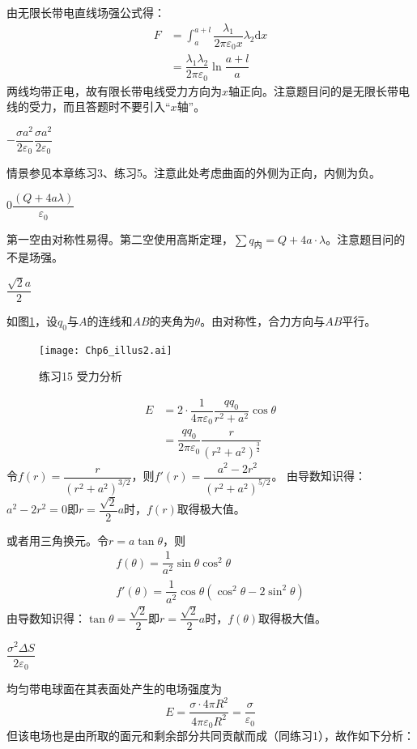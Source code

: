 \documentclass[b5paper,opensource,sourcefont,parskip]{qyxf-book}
\newcommand{\di}[1]{\mathrm{d}#1}
\begin{document}
由无限长带电直线场强公式得：
\begin{align*}
F&=\int_{a}^{a+l}\dfrac{\lambda_1}{2\pi \varepsilon_0 x}\lambda_2\di{x}\\
&=\dfrac{\lambda_1\lambda_2}{2\pi \varepsilon_0}\ln\dfrac{a+l}{a}
\end{align*}
两线均带正电，故有限长带电线受力方向为$x$轴正向。注意题目问的是无限长带电线的受力，而且答题时不要引入“$x$轴”。

$-\dfrac{\sigma a^2}{2\varepsilon_0}$\quad$\dfrac{\sigma a^2}{2\varepsilon_0}$

\solve
情景参见本章练习3、练习5。注意此处考虑曲面的外侧为正向，内侧为负。

0\quad $\dfrac{(Q+4a\lambda)}{\varepsilon_0}$

\solve
第一空由对称性易得。第二空使用高斯定理，$\sum q_{\text{内}}=Q+4a\cdot\lambda$。注意题目问的不是场强。

$\dfrac{\sqrt{2}a}{2}$

\solve
如图\ref{fig:c6-t15}，设$q_0$与$A$的连线和$AB$的夹角为$\theta$。由对称性，合力方向与$AB$平行。
\begin{figure}[!htbp]
	\centering
	\texttt{[image: Chp6\_illus2.ai]}
	\caption{练习15 受力分析}\label{fig:c6-t15}
\end{figure}
\begin{align*}
E&=2\cdot \dfrac{1}{4\pi\varepsilon_0}\dfrac{qq_0}{r^2+a^2}\cos\theta\\
&=\dfrac{qq_0}{2\pi\varepsilon_0}\dfrac{r}{{(r^2+a^2)}^{\frac{3}{2}}}
\end{align*}
令$f(r)=\dfrac{r}{{(r^2+a^2)}^{3/2}}$，则$f'(r)=\dfrac{a^2-2r^2}{{(r^2+a^2)}^{5/2}}$。
由导数知识得：$a^2-2r^2=0\text{即}r=\dfrac{\sqrt{2}}{2}a$时，$f(r)$取得极大值。

或者用三角换元。令$r=a\tan\theta$，则
\begin{gather*}
f(\theta)=\dfrac{1}{a^2}\sin\theta\cos^2\theta\\
f'(\theta)=\dfrac{1}{a^2}\cos\theta(\cos^2\theta-2\sin^2\theta)
\end{gather*}
由导数知识得：$\tan\theta=\dfrac{\sqrt{2}}{2}\text{即}r=\dfrac{\sqrt{2}}{2}a$时，$f(\theta)$取得极大值。

$\dfrac{\sigma^2\Delta S}{2\varepsilon_0}$

\solve
均匀带电球面在其表面处产生的电场强度为
\[
E=\dfrac{\sigma\cdot 4\pi R^2}{4\pi\varepsilon_0R^2}=\dfrac{\sigma}{\varepsilon_0}
\]
但该电场也是由所取的面元和剩余部分共同贡献而成（同练习1），故作如下分析：
\end{document}
